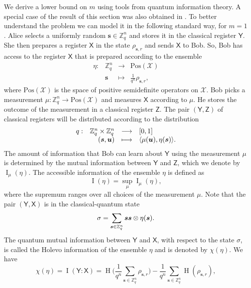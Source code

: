 \documentclass[11pt]{article}
\theoremstyle{plain}
\theoremstyle{definition}
\DeclareMathOperator{\entpy}{H}
\let\ket\relax
\DeclarePairedDelimiter{\ket}{\lvert}{\rangle}
\let\bra\relax
\DeclarePairedDelimiter{\bra}{\langle}{\rvert}
\DeclarePairedDelimiter{\lrang}{\langle}{\rangle}
\def\Z{\mathbb{Z}}
\def\X{\mathcal{X}}
\begin{document}
We derive a lower bound on $m$ using tools from quantum information theory. A special case of the result of this section was also obtained in \cite{bacon2005optimal}. To better understand the problem we can model it in the following standard way, for $m = 1$. Alice selects a uniformly random $\bm{s} \in \Z_q^n$ and stores it in the classical register $\mathsf{Y}$. She then prepares a register $\mathsf{X}$ in the state $\rho_{\bm{s}, r}$ and sends $\mathsf{X}$ to Bob. So, Bob has access to the register $\mathsf{X}$ that is prepared according to the ensemble
\[
\begin{array}{rrll}
    \eta: & \Z_q^n & \longrightarrow & \mathrm{Pos}(\X) \\
    & \bm{s} & \longmapsto & \frac{1}{q^n}\rho_{\bm{s}, r},
\end{array}
\]
where $\mathrm{Pos(\X)}$ is the space of positive semidefinite operators on $\X$. Bob picks a measurement $\mu: \Z_q^n \rightarrow \mathrm{Pos}(\X)$ and measures $\mathsf{X}$ according to $\mu$. He stores the outcome of the measurement in a classical register $\mathsf{Z}$. The pair $(\mathsf{Y}, \mathsf{Z})$ of classical registers will be distributed according to the distribution
\[
\begin{array}{rrll}
    q: & \Z_q^n \times \Z_q^n & \longrightarrow & [0, 1] \\
    & (\bm{s}, \bm{u}) & \longmapsto & \lrang{\mu(\bm{u}), \eta(\bm{s})}.
\end{array}
\]
The amount of information that Bob can learn about $\mathsf{Y}$ using the measurement $\mu$ is determined by the mutual information between $\mathsf{Y}$ and $\mathsf{Z}$, which we denote by $\operatorname{I}_\mu(\eta)$. The accessible information of the ensemble $\eta$ is defined as
\[ \operatorname{I}(\eta) = \sup_{\mu} \operatorname{I}_\mu(\eta), \]
where the supremum ranges over all choices of the measurement $\mu$. Note that the pair $(\mathsf{Y}, \mathsf{X})$ is in the classical-quantum state
\[ \sigma = \sum_{\bm{s} \in \Z_q^n} \ket{\bm{s}}\bra{\bm{s}} \otimes \eta(\bm{s}). \]
The quantum mutual information between $\mathsf{Y}$ and $\mathsf{X}$, with respect to the state $\sigma$, is called the Holevo information of the ensemble $\eta$ and is denoted by $\chi(\eta)$. We have
\begin{equation}
    \label{equ:holevo-chi}
    \chi(\eta) = \operatorname{I}(\mathsf{Y} : \mathsf{X}) = \entpy\Bigg( \frac{1}{q^n} \sum_{\bm{s} \in \Z_q^n} \rho_{\bm{s}, r} \Bigg) - \frac{1}{q^n} \sum_{\bm{s} \in \Z_q^n} \entpy(\rho_{\bm{s}, r}),
\end{equation}
\end{document}
